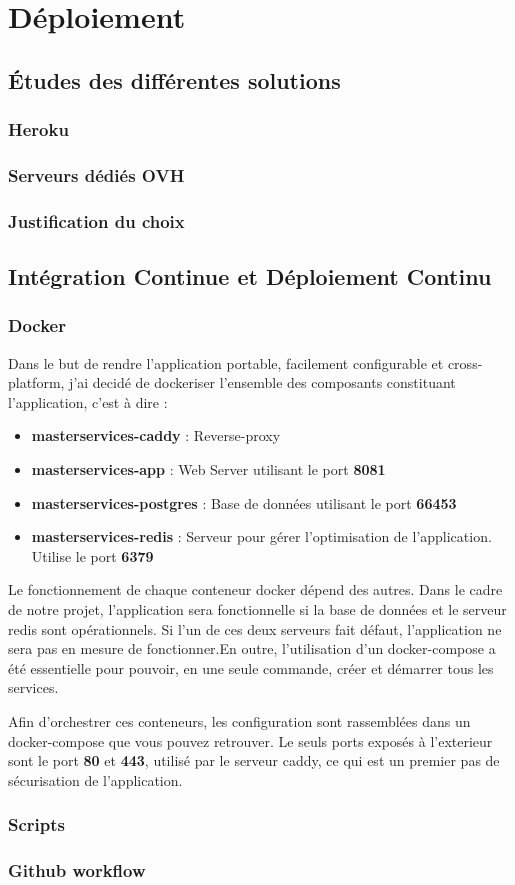 \section{Déploiement}
\subsection{Études des différentes solutions}
\subsubsection{Heroku}
\subsubsection{Serveurs dédiés OVH}
\subsubsection{Justification du choix}
\subsection{Intégration Continue et Déploiement Continu}
\subsubsection{Docker}
Dans le but de rendre l'application portable, facilement configurable et cross-platform, j'ai decidé de dockeriser l'ensemble des composants constituant l'application, c'est à dire :
\begin{itemize}
    \item \textbf{masterservices-caddy} : Reverse-proxy
    \item \textbf{masterservices-app} : Web Server utilisant le port \textbf{8081}
    \item \textbf{masterservices-postgres} : Base de données utilisant le port \textbf{66453}
    \item \textbf{masterservices-redis} : Serveur pour gérer l'optimisation de l'application. Utilise le port \textbf{6379}
\end{itemize}
Le fonctionnement de chaque conteneur docker dépend des autres. Dans le cadre de notre projet, l'application sera fonctionnelle si la base de données et le serveur redis sont opérationnels. Si l'un de ces deux serveurs fait défaut, l'application ne sera pas en mesure de fonctionner.En outre, l'utilisation d'un docker-compose a été essentielle pour pouvoir, en une seule commande, créer et démarrer tous les services. 

Afin d'orchestrer ces conteneurs, les configuration sont rassemblées dans un docker-compose que vous pouvez retrouver. Le seuls ports exposés à l'exterieur sont le port \textbf{80} et \textbf{443}, utilisé par le serveur caddy, ce qui est un premier pas de sécurisation de l'application. 
\subsubsection{Scripts}
\subsubsection{Github workflow}

